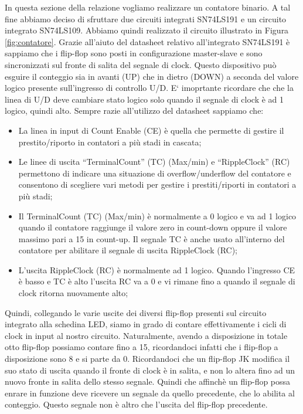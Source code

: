 In questa sezione della relazione vogliamo realizzare un contatore binario. A tal fine abbiamo deciso di sfruttare due circuiti integrati SN74LS191 e un circuito integrato SN74LS109. Abbiamo quindi realizzato il circuito illustrato in Figura \ref{fig:contatore}.
Grazie all'aiuto del datasheet relativo all'integrato SN74LS191 è sappiamo che i flip-flop sono posti in configurazione master-slave e sono sincronizzati sul fronte di salita del segnale di clock. Questo dispositivo può esguire il conteggio sia in avanti (UP) che in dietro (DOWN) a seconda del valore logico presente sull'ingresso di controllo U/D. E` imoprtante ricordare che che la linea di U/D deve cambiare stato logico solo quando il segnale di clock è ad 1 logico, quindi alto.
Sempre razie all'utilizzo del datasheet sappiamo che:
\begin{itemize} \itemsep2pt \parskip0pt 
	\item{La linea in input di Count Enable (CE) è quella che permette di gestire il prestito/riporto in contatori a più stadi in cascata;}
	\item{Le linee di uscita ``TerminalCount'' (TC) (Max/min) e ``RippleClock'' (RC) permettono di indicare una situazione di overflow/underflow del contatore e consentono di scegliere vari metodi per gestire i prestiti/riporti in contatori a più stadi;}
	\item{Il TerminalCount (TC) (Max/min) è normalmente a 0 logico e va ad 1 logico quando il contatore raggiunge il valore zero in count-down oppure il valore massimo pari a 15 in count-up. Il segnale TC è anche usato all’interno del contatore per abilitare il segnale di uscita RippleClock (RC);}
	\item{L’uscita RippleClock (RC) è normalmente ad 1 logico. Quando l’ingresso CE è basso e TC è alto l’uscita RC va a 0 e vi rimane fino a quando il segnale di clock ritorna nuovamente alto;}
\end{itemize}

Quindi, collegando le varie uscite dei diversi flip-flop presenti sul circuito integrato alla schedina LED, siamo in grado di contare effettivamente i cicli di clock in input al nostro circuito. Naturalmente, avendo a disposizione in totale otto flip-flop possiamo contare fino a 15, ricordandoci infatti che i flip-flop a disposizione sono 8 e si parte da 0.
Ricordandoci che un flip-flop JK modifica il suo stato di uscita quando il fronte di clock è in salita, e non lo altera fino ad un nuovo fronte in salita dello stesso segnale.
Quindi che affinchè un flip-flop possa enrare in funzione deve ricevere un segnale da quello precedente, che lo abilita al conteggio. Questo segnale non è altro che l'uscita del flip-flop precedente.

